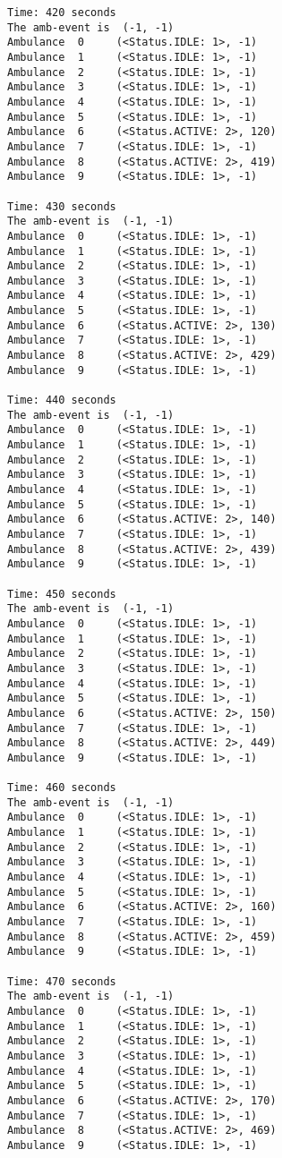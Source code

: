 \documentclass[11pt]{article}
\begin{document}
\begin{Verbatim}[commandchars=\\\{\}]
Time: 420 seconds
The amb-event is  (-1, -1)
Ambulance  0	 (<Status.IDLE: 1>, -1)
Ambulance  1	 (<Status.IDLE: 1>, -1)
Ambulance  2	 (<Status.IDLE: 1>, -1)
Ambulance  3	 (<Status.IDLE: 1>, -1)
Ambulance  4	 (<Status.IDLE: 1>, -1)
Ambulance  5	 (<Status.IDLE: 1>, -1)
Ambulance  6	 (<Status.ACTIVE: 2>, 120)
Ambulance  7	 (<Status.IDLE: 1>, -1)
Ambulance  8	 (<Status.ACTIVE: 2>, 419)
Ambulance  9	 (<Status.IDLE: 1>, -1)

Time: 430 seconds
The amb-event is  (-1, -1)
Ambulance  0	 (<Status.IDLE: 1>, -1)
Ambulance  1	 (<Status.IDLE: 1>, -1)
Ambulance  2	 (<Status.IDLE: 1>, -1)
Ambulance  3	 (<Status.IDLE: 1>, -1)
Ambulance  4	 (<Status.IDLE: 1>, -1)
Ambulance  5	 (<Status.IDLE: 1>, -1)
Ambulance  6	 (<Status.ACTIVE: 2>, 130)
Ambulance  7	 (<Status.IDLE: 1>, -1)
Ambulance  8	 (<Status.ACTIVE: 2>, 429)
Ambulance  9	 (<Status.IDLE: 1>, -1)

Time: 440 seconds
The amb-event is  (-1, -1)
Ambulance  0	 (<Status.IDLE: 1>, -1)
Ambulance  1	 (<Status.IDLE: 1>, -1)
Ambulance  2	 (<Status.IDLE: 1>, -1)
Ambulance  3	 (<Status.IDLE: 1>, -1)
Ambulance  4	 (<Status.IDLE: 1>, -1)
Ambulance  5	 (<Status.IDLE: 1>, -1)
Ambulance  6	 (<Status.ACTIVE: 2>, 140)
Ambulance  7	 (<Status.IDLE: 1>, -1)
Ambulance  8	 (<Status.ACTIVE: 2>, 439)
Ambulance  9	 (<Status.IDLE: 1>, -1)

Time: 450 seconds
The amb-event is  (-1, -1)
Ambulance  0	 (<Status.IDLE: 1>, -1)
Ambulance  1	 (<Status.IDLE: 1>, -1)
Ambulance  2	 (<Status.IDLE: 1>, -1)
Ambulance  3	 (<Status.IDLE: 1>, -1)
Ambulance  4	 (<Status.IDLE: 1>, -1)
Ambulance  5	 (<Status.IDLE: 1>, -1)
Ambulance  6	 (<Status.ACTIVE: 2>, 150)
Ambulance  7	 (<Status.IDLE: 1>, -1)
Ambulance  8	 (<Status.ACTIVE: 2>, 449)
Ambulance  9	 (<Status.IDLE: 1>, -1)

Time: 460 seconds
The amb-event is  (-1, -1)
Ambulance  0	 (<Status.IDLE: 1>, -1)
Ambulance  1	 (<Status.IDLE: 1>, -1)
Ambulance  2	 (<Status.IDLE: 1>, -1)
Ambulance  3	 (<Status.IDLE: 1>, -1)
Ambulance  4	 (<Status.IDLE: 1>, -1)
Ambulance  5	 (<Status.IDLE: 1>, -1)
Ambulance  6	 (<Status.ACTIVE: 2>, 160)
Ambulance  7	 (<Status.IDLE: 1>, -1)
Ambulance  8	 (<Status.ACTIVE: 2>, 459)
Ambulance  9	 (<Status.IDLE: 1>, -1)

Time: 470 seconds
The amb-event is  (-1, -1)
Ambulance  0	 (<Status.IDLE: 1>, -1)
Ambulance  1	 (<Status.IDLE: 1>, -1)
Ambulance  2	 (<Status.IDLE: 1>, -1)
Ambulance  3	 (<Status.IDLE: 1>, -1)
Ambulance  4	 (<Status.IDLE: 1>, -1)
Ambulance  5	 (<Status.IDLE: 1>, -1)
Ambulance  6	 (<Status.ACTIVE: 2>, 170)
Ambulance  7	 (<Status.IDLE: 1>, -1)
Ambulance  8	 (<Status.ACTIVE: 2>, 469)
Ambulance  9	 (<Status.IDLE: 1>, -1)


\end{Verbatim}
\end{document}
